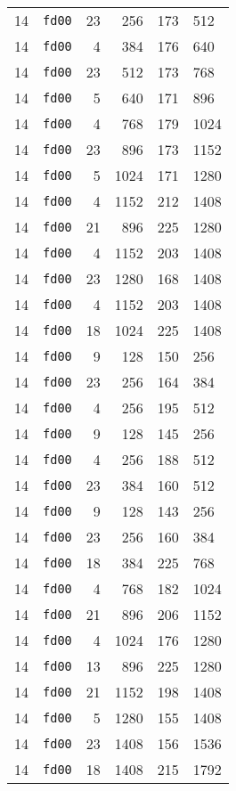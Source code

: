\documentclass{article}
\begin{document}
\begin{table}[h!]
\begin{tabular}{llrrrl}
    14 & \texttt{fd00} & 23 & 256 & 173 & 512 \\
    14 & \texttt{fd00} & 4 & 384 & 176 & 640 \\
    14 & \texttt{fd00} & 23 & 512 & 173 & 768 \\
    14 & \texttt{fd00} & 5 & 640 & 171 & 896 \\
    14 & \texttt{fd00} & 4 & 768 & 179 & 1024 \\
    14 & \texttt{fd00} & 23 & 896 & 173 & 1152 \\
    14 & \texttt{fd00} & 5 & 1024 & 171 & 1280 \\
    14 & \texttt{fd00} & 4 & 1152 & 212 & 1408 \\
    14 & \texttt{fd00} & 21 & 896 & 225 & 1280 \\
    14 & \texttt{fd00} & 4 & 1152 & 203 & 1408 \\
    14 & \texttt{fd00} & 23 & 1280 & 168 & 1408 \\
    14 & \texttt{fd00} & 4 & 1152 & 203 & 1408 \\
    14 & \texttt{fd00} & 18 & 1024 & 225 & 1408 \\
    14 & \texttt{fd00} & 9 & 128 & 150 & 256 \\
    14 & \texttt{fd00} & 23 & 256 & 164 & 384 \\
    14 & \texttt{fd00} & 4 & 256 & 195 & 512 \\
    14 & \texttt{fd00} & 9 & 128 & 145 & 256 \\
    14 & \texttt{fd00} & 4 & 256 & 188 & 512 \\
    14 & \texttt{fd00} & 23 & 384 & 160 & 512 \\
    14 & \texttt{fd00} & 9 & 128 & 143 & 256 \\
    14 & \texttt{fd00} & 23 & 256 & 160 & 384 \\
    14 & \texttt{fd00} & 18 & 384 & 225 & 768 \\
    14 & \texttt{fd00} & 4 & 768 & 182 & 1024 \\
    14 & \texttt{fd00} & 21 & 896 & 206 & 1152 \\
    14 & \texttt{fd00} & 4 & 1024 & 176 & 1280 \\
    14 & \texttt{fd00} & 13 & 896 & 225 & 1280 \\
    14 & \texttt{fd00} & 21 & 1152 & 198 & 1408 \\
    14 & \texttt{fd00} & 5 & 1280 & 155 & 1408 \\
    14 & \texttt{fd00} & 23 & 1408 & 156 & 1536 \\
    14 & \texttt{fd00} & 18 & 1408 & 215 & 1792 \\

\end{tabular}
\end{table}
\end{document}
